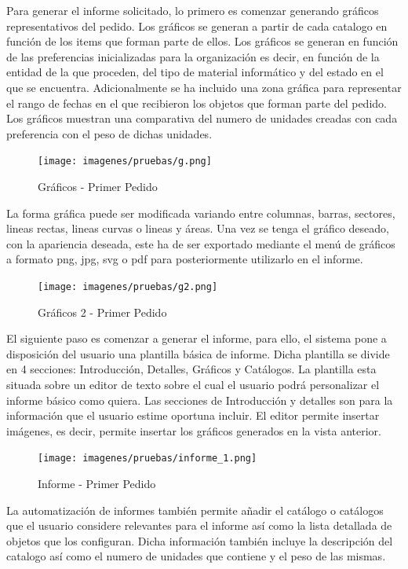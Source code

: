 \documentclass[a4paper,11pt]{book}
\begin{document}
Para generar el informe solicitado, lo primero es comenzar generando gráficos representativos del pedido. Los gráficos se generan a partir de cada catalogo en función de los items que forman parte de ellos. Los gráficos se generan en función de las preferencias inicializadas para la organización es decir, en función de la entidad de la que proceden, del tipo de material informático y del estado en el que se encuentra. Adicionalmente se ha incluido una zona gráfica para representar el rango de fechas en el que recibieron los objetos que forman parte del pedido. Los gráficos muestran una comparativa del numero de unidades creadas con cada preferencia con el peso de dichas unidades. 

\begin{figure}[H] 
\centering 
\texttt{[image: imagenes/pruebas/g.png]}
\caption{ Gráficos - Primer Pedido\cite{propio}}
\end{figure}

La forma gráfica puede ser modificada variando entre columnas, barras, sectores, lineas rectas, lineas curvas o lineas y áreas. Una vez se tenga el gráfico deseado, con la apariencia deseada,  este ha de ser exportado mediante el menú de gráficos a formato png, jpg, svg o pdf para posteriormente utilizarlo en el informe. 

\begin{figure}[H] 
\centering 
\texttt{[image: imagenes/pruebas/g2.png]}
\caption{ Gráficos 2 - Primer Pedido\cite{propio}}
\end{figure}

El siguiente paso es comenzar a generar el informe, para ello, el sistema pone a disposición del usuario una plantilla básica de informe. Dicha plantilla se divide en 4 secciones: Introducción, Detalles, Gráficos y Catálogos. La plantilla esta situada sobre un editor de texto sobre el cual el usuario podrá personalizar el informe básico como quiera. Las secciones de Introducción y detalles son para la información que el usuario estime oportuna incluir. 
El editor permite insertar imágenes, es decir, permite insertar los gráficos generados en la vista anterior.

\begin{figure}[H] 
\centering 
\texttt{[image: imagenes/pruebas/informe\_1.png]}
\caption{ Informe - Primer Pedido\cite{propio}}
\end{figure}

La automatización de informes también permite añadir el catálogo o catálogos que el usuario considere relevantes para el informe así como la lista detallada de objetos que los configuran. Dicha información también incluye la descripción del catalogo así como el numero de unidades que contiene y el peso de las mismas.  
\end{document}
